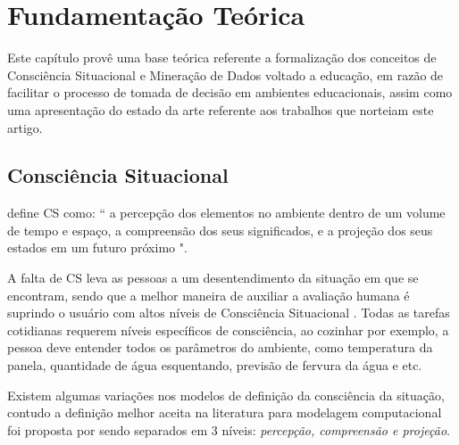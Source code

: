 \documentclass[12pt]{article}
\begin{document}
\section{Fundamentação Teórica} \label{sec:firstpage}
	
Este capítulo provê uma base teórica referente a formalização dos conceitos de Consciência Situacional e Mineração de Dados voltado a educação, em razão de facilitar o processo de tomada de decisão em ambientes educacionais, assim como uma apresentação do estado da arte referente aos trabalhos que norteiam este artigo.  

\subsection{Consciência Situacional}

\cite [p. 97]{Endsley1988} define CS como: `` a percepção dos elementos no ambiente dentro de um volume de tempo e espaço, a compreensão dos seus significados, e a projeção dos seus estados em um futuro próximo ".

A falta de CS leva as pessoas a um desentendimento da situação em que se encontram, sendo que a melhor maneira de auxiliar a avaliação humana é suprindo o usuário com altos níveis de Consciência Situacional \cite{Endsley2012}. Todas as tarefas cotidianas requerem níveis específicos de consciência, ao cozinhar por exemplo, a pessoa deve entender todos os parâmetros do ambiente, como temperatura da panela, quantidade de água esquentando, previsão de fervura da água e etc.

Existem algumas variações nos modelos de definição da consciência da situação, contudo a definição melhor aceita na literatura para modelagem computacional foi proposta por \cite{Endsley1995} sendo separados em 3 níveis: \emph{percepção, compreensão e projeção}.
\end{document}
